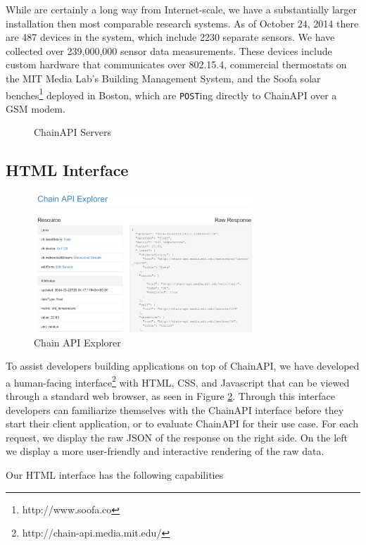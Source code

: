 \documentclass{acm_proc_article-sp}
\begin{document}
While are certainly a long way from Internet-scale, we have a substantially
larger installation then most comparable research systems. As of October 24,
2014 there are 487 devices in the system, which include 2230 separate sensors.
We have collected over 239,000,000 sensor data measurements. These devices
include custom hardware that communicates over 802.15.4, commercial thermostats
on the MIT Media Lab's Building Management System, and the Soofa solar
benches\footnote{http://www.soofa.co} deployed in Boston, which are
\texttt{POST}ing directly to ChainAPI over a GSM modem.

\begin{figure}
    \centering
    
    \caption{ChainAPI Servers}
    \label{chain_actual}
\end{figure}

\subsection{HTML Interface}

\begin{figure}
    \centering
    \includegraphics[width=8.45cm, frame]{chain_explorer2}
    \caption{Chain API Explorer}
    \label{chain_explorer}
\end{figure}

To assist developers building applications on top of ChainAPI, we have
developed a human-facing interface\footnote{http://chain-api.media.mit.edu/}
with HTML, CSS, and Javascript that can be viewed through a standard web
browser, as seen in Figure \ref{chain_explorer}.  Through this interface
developers can familiarize themselves with the ChainAPI interface before they
start their client application, or to evaluate ChainAPI for their use case.
For each request, we display the raw JSON of the response on the right side. On
the left we display a more user-friendly and interactive rendering of the raw
data.

Our HTML interface has the following capabilities
\end{document}
